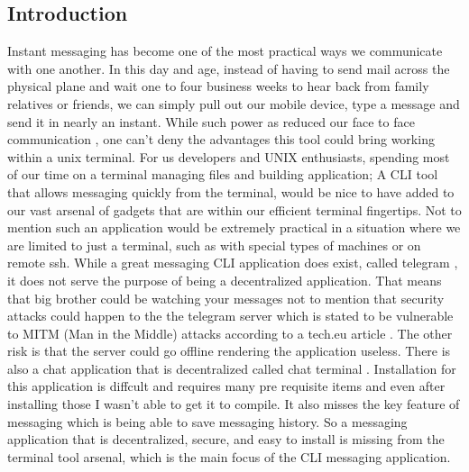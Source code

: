 \documentclass[twoside]{article}
\begin{document}
\begin{multicols}{2} %

\section{Introduction}

\lettrine[nindent=0em,lines=3]{I}{}nstant messaging has become one of the most practical ways we communicate with one another. In this day and age, instead of having to send mail across the physical plane and
wait one to four business weeks to hear back from family relatives or friends, we can simply pull out our mobile device, type a 
message and send it in nearly an instant. While such power as reduced our face to face communication \cite{hemmer}, one can't deny the
advantages this tool could bring working within a unix terminal. For us developers and
UNIX enthusiasts, spending most of our time on a terminal managing files and building application; A CLI tool that allows messaging quickly from the 
terminal, would be nice to have added to our vast arsenal of gadgets that are within 
our efficient terminal fingertips. Not to mention such an application would be extremely practical in a situation where we are limited 
to just a terminal, such as with special types of machines or on remote ssh. While a great messaging CLI application does exist, 
called telegram \cite{telegram}, it does not serve the purpose of being a decentralized application. That means that big brother 
could be watching your messages not to mention that security attacks could happen to the the telegram server which is stated to be 
vulnerable to MITM (Man in the Middle) attacks according to a tech.eu article \cite{wauters}. The other risk is that the server could go offline 
rendering the application useless. There is also a chat application that is decentralized called chat terminal \cite{lanchat}. 
Installation for this application is diffcult and requires many pre requisite items and even after installing those I wasn't able to get it to compile. 
It also misses the key feature of messaging which is being able to save messaging history.  
So a messaging application that is decentralized, secure, and easy to install is missing from the terminal tool arsenal, which is the main focus of the CLI messaging 
application. 



\end{multicols}
\end{document}

